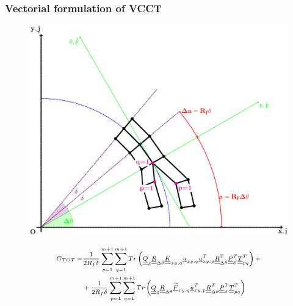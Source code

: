 \documentclass[first,firstsupp,lastsupp,last,hyperref,table]{ETHclass}
\begin{document}
\begin{frame}
\frametitle{\vspace{0.25cm}\small Vectorial formulation of VCCT}
\vspace{-.75cm}
\centering
\begin{figure}
\centering
\includegraphics[height=0.5\textheight]{VCCT-linear.pdf}
\end{figure}
\begin{equation*}
\scriptsize
\begin{split}
G_{TOT} =&\frac{1}{2R_{f}\delta}\sum_{p=1}^{m+1}\sum_{q=1}^{m+1}Tr\left(\underline{\underline{Q}}_{\delta}\underline{\underline{R}}_{\Delta\theta}\underline{\underline{K}}_{xy,q}\underline{u}_{xy,q}\underline{u}_{xy,p}^{T}\underline{\underline{R}}_{\Delta\theta}^{T}\underline{\underline{P}}_{\delta}^{T}\underline{\underline{T}}_{pq}^{T}\right)+\\&+\frac{1}{2R_{f}\delta}\sum_{p=1}^{m+1}\sum_{q=1}^{m+1}Tr\left(\underline{\underline{Q}}_{\delta}\underline{\underline{R}}_{\Delta\theta}\underline{\widetilde{F}}_{xy,q}\underline{u}_{xy,p}^{T}\underline{\underline{R}}_{\Delta\theta}^{T}\underline{\underline{P}}_{\delta}^{T}\underline{\underline{T}}_{pq}^{T}\right)
\end{split}
\end{equation*}
\end{frame}

\addtocounter{framenumber}{-1}
\end{document}
